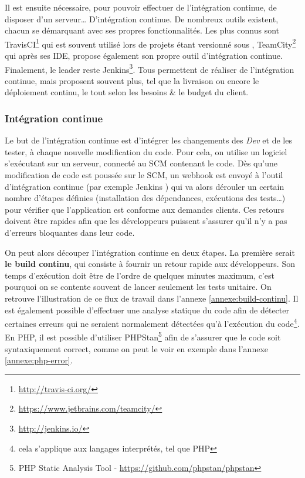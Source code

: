 Il est ensuite nécessaire, pour pouvoir effectuer de l'intégration continue, de disposer d'un serveur\ldots{} D'intégration continue. De nombreux outils existent, chacun se démarquant avec ses propres fonctionnalités. Les plus connus sont TravisCI\footnote{\url{http://travis-ci.org/}} qui est souvent utilisé lors de projets étant versionné sous \github, TeamCity\footnote{\url{https://www.jetbrains.com/teamcity/}} qui après ses \gls{IDE}, propose également son propre outil d'intégration continue. Finalement, le leader reste Jenkins\footnote{\url{http://jenkins.io/}}. Tous permettent de réaliser de l'intégration continue, mais proposent souvent plus, tel que la livraison ou encore le déploiement continu, le tout selon les besoins \& le budget du client.

\subsubsection{Intégration continue}

Le but de l'intégration continue est d'intégrer les changements des \emph{Dev} et de les tester, à chaque nouvelle modification du code. Pour cela, on utilise un logiciel s'exécutant sur un serveur, connecté au \gls{SCM} contenant le code. Dès qu'une modification de code est poussée sur le \gls{SCM}, un \gls{webhook} est envoyé à l'outil d'intégration continue (par exemple Jenkins \cite{jenkins-guide}) qui va alors dérouler un certain nombre d'étapes définies (installation des dépendances, exécutions des tests\ldots) pour vérifier que l'application est conforme aux demandes clients. Ces retours doivent être rapides afin que les développeurs puissent s'assurer qu'il n'y a pas d'erreurs bloquantes dans leur code.

On peut alors découper l'intégration continue en deux étapes. La première serait \textbf{le build continu}, qui consiste à fournir un retour rapide aux développeurs. Son temps d'exécution doit être de l'ordre de quelques minutes maximum, c'est pourquoi on se contente souvent de lancer seulement les tests unitaire. On retrouve l'illustration de ce flux de travail dans l'annexe \ref{annexe:build-continu}. Il est également possible d'effectuer une analyse statique du code afin de détecter certaines erreurs qui ne seraient normalement détectées qu'à l'exécution du code\footnote{cela s'applique aux langages interprétés, tel que \gls{PHP}}. En \gls{PHP}, il est possible d'utiliser PHPStan\footnote{PHP Static Analysis Tool - \url{https://github.com/phpstan/phpstan}} afin de s'assurer que le code soit syntaxiquement correct, comme on peut le voir en exemple dans l'annexe \ref{annexe:php-error}.

